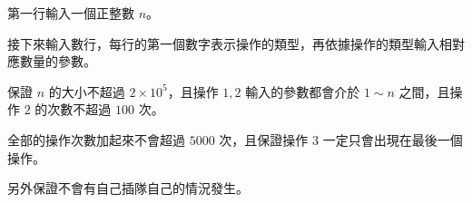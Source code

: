 第一行輸入一個正整數 $n$。

接下來輸入數行，每行的第一個數字表示操作的類型，再依據操作的類型輸入相對應數量的參數。

保證 $n$ 的大小不超過 $2 \times 10^5$，且操作 $1,2$ 輸入的參數都會介於 $1 \sim n$ 之間，且操作 $2$ 的次數不超過 $100$ 次。

全部的操作次數加起來不會超過 $5000$ 次，且保證操作 $3$ 一定只會出現在最後一個操作。

另外保證不會有自己插隊自己的情況發生。
